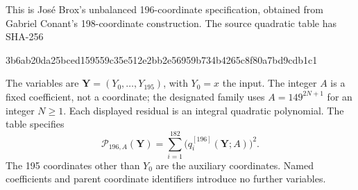 \begingroup
\allowdisplaybreaks[1]
This is Jos\'e Brox's unbalanced 196-coordinate specification, obtained
from Gabriel Conant's 198-coordinate construction. The source quadratic
table has SHA-256
\begin{center}\small\ttfamily
3b6ab20da25bced159559c35e512e2bb2e56959b734b4265c8f80a7bd9cdb1c1
\end{center}
The variables are $\mathbf Y=(Y_0,\ldots,Y_{195})$, with $Y_0=x$ the input.
The integer $A$ is a fixed coefficient, not a coordinate; the designated
family uses $A=149^{2N+1}$ for an integer $N\geq1$. Each displayed
residual is an integral quadratic polynomial. The table specifies
\[
\mathcal P_{196,A}(\mathbf Y)=\sum_{i=1}^{182}
\bigl(q_i^{[196]}(\mathbf Y;A)\bigr)^2.
\]
The 195 coordinates other than $Y_0$ are the auxiliary coordinates.
Named coefficients and parent coordinate identifiers introduce no further variables.
